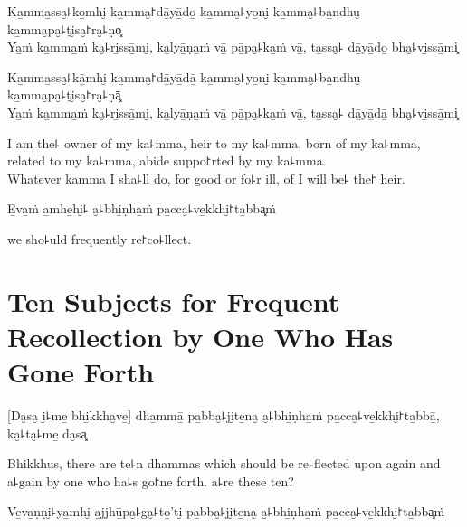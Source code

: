 %
Ka̱mma̱ssa̮꜕ko̱mhi̮ ka̱mma̮꜓dā̱yā̱do̱ ka̱mma̮꜕yo̱ni̮ ka̱mma̮꜕ba̱ndhu̮ ka̱mma̮pa̮꜕ṭi̮sa̮꜓ra̮꜕ṇo͓\\
Ya̱ṁ ka̱mma̱ṁ ka̮꜕ri̱ssā̱mi̮, ka̱lyā̱ṇa̱ṁ vā̱ pā̱pa̮꜕ka̱ṁ vā̱, ta̱ssa̮꜕ dā̱yā̱do̱ bha̮꜕vi̱ssā̱mi͓

\clearpage

%
Ka̱mma̱ssa̮꜕kā̱mhi̮ ka̱mma̮꜓dā̱yā̱dā̱ ka̱mma̮꜕yo̱ni̮ ka̱mma̮꜕ba̱ndhu̮ ka̱mma̮pa̮꜕ṭi̮sa̮꜓ra̮꜕ṇā͓\\
Ya̱ṁ ka̱mma̱ṁ ka̮꜕ri̱ssā̱mi̮, ka̱lyā̱ṇa̱ṁ vā̱ pā̱pa̮꜕ka̱ṁ vā̱, ta̱ssa̮꜕ dā̱yā̱dā̱ bha̮꜕vi̱ssā̱mi͓

\begin{english}
  I am the꜕ owner of my ka꜕mma, heir to my ka꜕mma, born of my ka꜕mma,\\
  related to my ka꜕mma, abide suppo꜓rted by my ka꜕mma.\\
  Whatever kamma I sha꜕ll do, for good or fo꜕r ill, of  I will be꜕ the꜓ heir.
\end{english}

E̱va̱ṁ a̱mhe̱hi̮꜕ a̮꜕bhi̱ṇha̱ṁ pa̱cca̮꜕ve̱kkhi̮꜓ta̱bba͓ṁ

\begin{english}
   we sho꜕uld frequently re꜓co꜕llect.
\end{english}

\chapter[Ten Subjects]{Ten Subjects for Frequent Recollection by One Who Has Gone Forth}


\enlargethispage{\baselineskip}

\begin{leader}
\end{leader}

[Da̮sa̮ i̮꜕me̱ bhi̱kkha̮ve̱] dha̱mmā̱ pa̱bba̮꜕ji̮te̱na̮ a̮꜕bhi̱ṇha̱ṁ pa̱cca̮꜕ve̱kkhi̮꜓ta̱bbā̱, ka̮꜕ta̮꜕me̱ da̮sa͓

\begin{english}
  Bhikkhus, there are te꜕n dhammas which should be re꜕flected upon again and a꜕gain by one who ha꜕s go꜓ne forth.  a꜕re these ten?
\end{english}

Ve̱va̱ṇṇi̮꜕ya̱mhi̮ a̱jjhū̱pa̮꜕ga̮꜕to̱'ti̮ pa̱bba̮꜕ji̮te̱na̮ a̮꜕bhi̱ṇha̱ṁ pa̱cca̮꜕ve̱kkhi̮꜓ta̱bba͓ṁ

